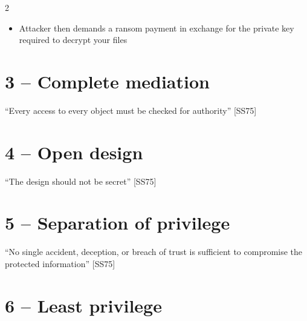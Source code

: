 \documentclass[a4paper,9pt]{extarticle}
\begin{document}
\begin{multicols}{2}
\begin{definition}
\begin{itemize}
\item Attacker then demands a ransom payment in exchange for the private key required to decrypt
your files

\end{itemize}

\end{definition}



\columnbreak

\section{3 -- Complete mediation}


\begin{important}

``Every access to every object must be checked for authority'' [SS75]

\end{important}



\section{4 -- Open design}


\begin{important}

``The design should not be secret'' [SS75]

\end{important}



\section{5 -- Separation of privilege}


\begin{important}

``No single accident, deception, or breach of trust is sufficient to
compromise the protected information'' [SS75]

\end{important}



\section{6 -- Least privilege}



\end{multicols}
\end{document}
